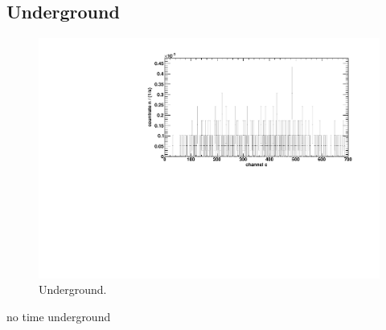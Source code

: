 \subsection{Underground}
\begin{figure}[H]
\begin{center}
  \includegraphics[width=\textwidth]{../img/underground.pdf}
  \caption{Underground.}
  \label{img:underground}
\end{center}
\end{figure}

no time underground

